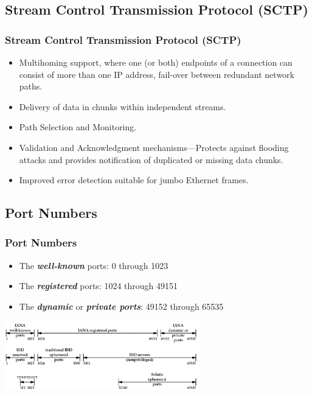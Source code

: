 \documentclass[notes,serif]{beamer}
\begin{document}
\subsection{Stream Control Transmission Protocol (SCTP)}
\begin{frame}
  \frametitle{Stream Control Transmission Protocol (SCTP)}
\begin{itemize}
  \item Multihoming support, where one (or both) endpoints of a connection can consist of more than one IP address, fail-over between redundant network paths.
  \item Delivery of data in chunks within independent streams.
  \item Path Selection and Monitoring.
  \item Validation and Acknowledgment mechanisms---Protects against flooding attacks and provides notification of duplicated or missing data chunks.
  \item Improved error detection suitable for jumbo Ethernet frames.
\end{itemize}
\end{frame}

\subsection{Port Numbers}
\begin{frame}
  \frametitle{Port Numbers}
    \begin{itemize}
      \item The {\bf \em well-known} ports: 0 through 1023
      \item The {\bf \em registered} ports: 1024 through 49151
      \item The {\bf \em dynamic} or {\bf \em private ports}: 49152 through 65535
    \end{itemize}
    \hspace{2em} \includegraphics[height=3cm]{figs/02fig10.png}
\end{frame}
\end{document}
